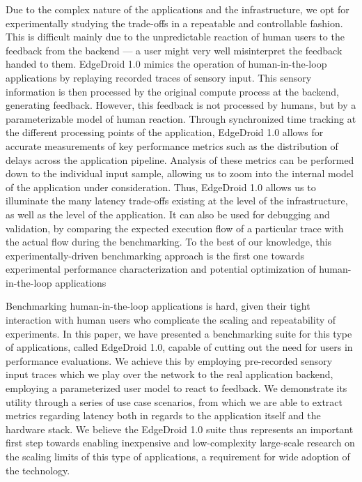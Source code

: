 Due to the complex nature of the applications and the infrastructure, we opt for experimentally studying the trade-offs in a repeatable and controllable fashion.
This is difficult mainly due to the unpredictable reaction of human users to the feedback from the backend --- a user might very well misinterpret the feedback handed to them.
EdgeDroid 1.0 mimics the operation of human-in-the-loop applications by replaying recorded traces of sensory input.
This sensory information is then processed by the original compute process at the backend, generating feedback.
However, this feedback is not processed by humans, but by a parameterizable model of human reaction.
Through synchronized time tracking at the different processing points of the application, EdgeDroid 1.0 allows for accurate measurements of key performance metrics such as the distribution of delays across the application pipeline.
Analysis of these metrics can be performed down to the individual input sample, allowing us to zoom into the internal model of the application under consideration.
Thus, EdgeDroid 1.0 allows us to illuminate the many latency trade-offs existing at the level of the infrastructure, as well as the level of the application.
It can also be used for debugging and validation, by comparing the expected execution flow of a particular trace with the actual flow during the benchmarking.
To the best of our knowledge, this experimentally-driven benchmarking approach is the first one towards experimental performance characterization and potential optimization of human-in-the-loop applications

Benchmarking human-in-the-loop applications is hard, given their tight interaction with human users who complicate the scaling and repeatability of experiments.
In this paper, we have presented a benchmarking suite for this type of applications, called EdgeDroid 1.0, capable of cutting out the need for users in performance evaluations.
We achieve this by employing pre-recorded sensory input traces which we play over the network to the real application backend, employing a parameterized user model to react to feedback.
We demonstrate its utility through a series of use case scenarios, from which we are able to extract metrics regarding latency both in regards to the application itself and the hardware stack.
We believe the EdgeDroid 1.0 suite thus represents an important first step towards enabling inexpensive and low-complexity large-scale research on the scaling limits of this type of applications, a requirement for wide adoption of the technology.

